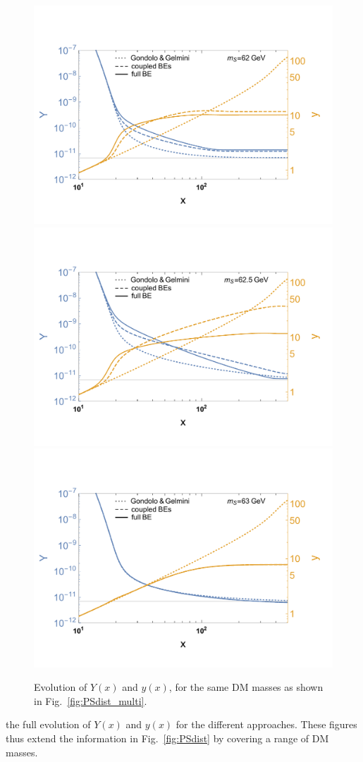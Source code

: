 \documentclass[twocolumn,showpacs,amsmath,amssymb,superscriptaddress,nofootinbib]{revtex4-1}
\begin{document}
\begin{figure}
  \includegraphics[trim={1cm 1cm 1cm 1cm}, width=0.65\columnwidth]{Yyx_mDM62}
  \hspace{0.3cm}
  \includegraphics[trim={1cm 1cm 1cm 1cm}, width=0.65\columnwidth]{Yyx_mDM62_5}
  \hspace{0.3cm}
  \includegraphics[trim={1cm 1cm 1cm 1cm}, width=0.65\columnwidth]{Yyx_mDM63}
  \caption{Evolution of $Y(x)$ and $y(x)$, for the same DM masses as shown in Fig.~\ref{fig:PSdist_multi}.
}
    \label{fig:yYx} \vspace{-0.3cm}
\end{figure} 
the full evolution of $Y(x)$ and $y(x)$ for the different approaches. These figures thus extend the information in Fig.~\ref{fig:PSdist} by covering a range of DM masses.
\end{document}
